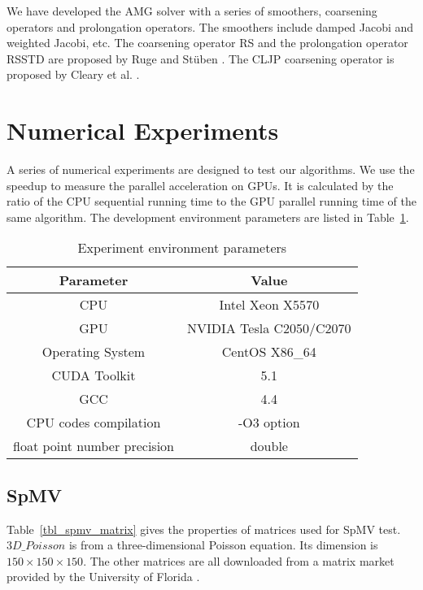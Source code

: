 \documentclass[runningheads,a4paper]{llncs}
\begin{document}
{\begin{algorithm}
\begin{algorithmic}
\end{algorithmic}
\end{algorithm}

We have developed the AMG solver with a series of smoothers, coarsening operators and prolongation operators. The smoothers include damped Jacobi and weighted Jacobi, etc. The coarsening operator RS and the prolongation operator RSSTD are proposed by Ruge and St\"{u}ben  \cite{Stuben1,Stuben2}. The CLJP coarsening operator is proposed by Cleary et al. \cite{hypre,rsamg}.
\section{Numerical Experiments}
\label{sec_experiment}
 A series of numerical experiments are designed to test our algorithms. We use the speedup to measure the parallel acceleration on GPUs. It is calculated by the ratio of the CPU sequential running time to the GPU parallel running time of the same algorithm. The development environment parameters are listed in Table~\ref{tbl_ep}.

\begin{table}[!htb]
\centering
\caption{Experiment environment parameters}
\begin{tabular}{|c|c|} \hline
\bfseries Parameter & \bfseries Value \\ \hline
CPU                             & Intel Xeon X5570          \\ \hline
GPU                             & NVIDIA Tesla C2050/C2070  \\ \hline
Operating System                & CentOS X86\_64            \\ \hline
CUDA Toolkit                    & 5.1                       \\ \hline
GCC                             & 4.4                       \\ \hline
CPU codes compilation           & -O3 option                \\ \hline
float point number precision    & double                    \\ \hline
\end{tabular}
\label{tbl_ep}
\end{table}

\subsection{SpMV}

Table~\ref{tbl_spmv_matrix} gives the properties of matrices used for SpMV test. $3D\_Poisson$ is from a three-dimensional Poisson equation. Its dimension is $150\times150\times150$. The other matrices are all downloaded from a matrix market provided by the University of Florida \cite{mmarket}.

}
\end{document}
